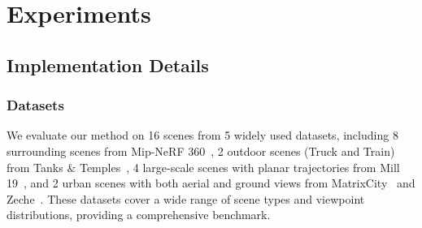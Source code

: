 \documentclass[lettersize,journal]{IEEEtran}
\begin{document}



\section{Experiments\label{sec:experiments}}
 
\subsection{Implementation Details}


\subsubsection{Datasets}

We evaluate our method on 16 scenes from 5 widely used datasets, including
8 surrounding scenes 
from Mip-NeRF 360~\cite{mipnerf360},
2 outdoor scenes (Truck and Train) from Tanks \& Temples~\cite{tankstemples},
4 large-scale scenes with planar trajectories from Mill 19~\cite{meganerf},
and 2 urban scenes with both aerial and ground views from MatrixCity~\cite{matrixcity} and Zeche~\cite{isprs}.
These datasets cover a wide range of scene types and viewpoint distributions, providing a comprehensive benchmark.
\end{document}
